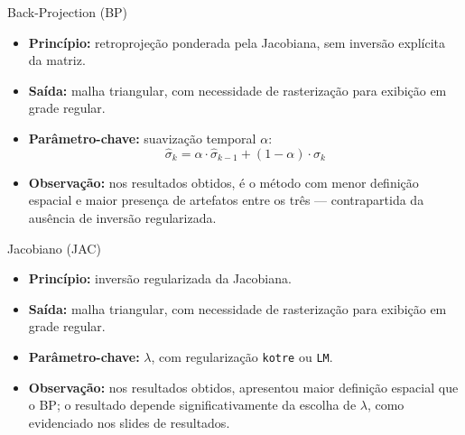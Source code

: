 \documentclass[aspectratio=169]{beamer}
\begin{document}
\begin{frame}{Back-Projection (BP)}
\begin{tcolorbox}[ufabcbox,title=Back-Projection (BP)]
\footnotesize
\begin{itemize}\setlength{\itemsep}{3pt}\setlength{\parskip}{0pt}\setlength{\topsep}{2pt}
  \item \textbf{Princípio:} retroprojeção ponderada pela Jacobiana, sem inversão explícita da matriz.
  \item \textbf{Saída:} malha triangular, com necessidade de rasterização para exibição em grade regular.
  \item \textbf{Parâmetro-chave:} suavização temporal $\alpha$:
  \[
  \hat{\sigma}_k = \alpha \cdot \hat{\sigma}_{k-1} + (1-\alpha)\cdot \sigma_k
  \]
  \item \textbf{Observação:} nos resultados obtidos, é o método com menor definição espacial e maior presença de artefatos entre os três --- contrapartida da ausência de inversão regularizada.
\end{itemize}
\end{tcolorbox}
\end{frame}

\begin{frame}{Jacobiano (JAC)}
\begin{tcolorbox}[ufabcbox,title=Jacobiano (JAC)]
\footnotesize
\begin{itemize}\setlength{\itemsep}{3pt}\setlength{\parskip}{0pt}\setlength{\topsep}{2pt}
  \item \textbf{Princípio:} inversão regularizada da Jacobiana.
  \item \textbf{Saída:} malha triangular, com necessidade de rasterização para exibição em grade regular.
  \item \textbf{Parâmetro-chave:} $\lambda$, com regularização \texttt{kotre} ou \texttt{LM}.
  \item \textbf{Observação:} nos resultados obtidos, apresentou maior definição espacial que o BP; o resultado depende significativamente da escolha de $\lambda$, como evidenciado nos slides de resultados.
\end{itemize}
\end{tcolorbox}
\end{frame}
\end{document}
